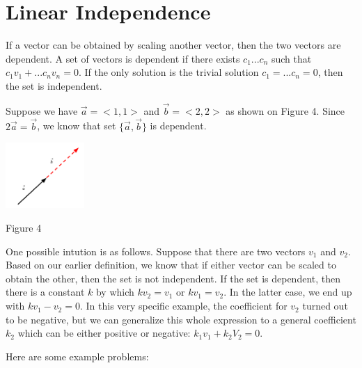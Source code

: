 \documentclass{article}
\begin{document}
\section{Linear Independence}
\par\noindent If a vector can be obtained by scaling another vector, then the two vectors are dependent. A set of vectors is dependent if there exists \( c_1 ... c_n\) such that \(c_1v_1 + ... c_nv_n = 0\). If the only solution is the trivial solution \(c_1 = ... c_n = 0\), then the set is independent. 
\newline
\begin{minipage}[c]{.5\linewidth}
	\par \noindent Suppose we have \( \vec a = <1,1>\) and \( \vec b = <2,2>\) as shown on Figure 4. Since \( 2\vec a = \vec b\), we know that set \( \{ \vec a, \vec b\}\) is dependent.
\end{minipage}%
\begin{minipage}[c]{.5\linewidth}
	\begin{center}
		\includegraphics[width=3cm]{linear-combo.png}
	\end{center}
	\begin{center}
		Figure 4
	\end{center}
\end{minipage}
\newline
\par\noindent One possible intution is as follows. Suppose that there are two vectors \(v_1\) and \(v_2\). Based on our earlier definition, we know that if either vector can be scaled to obtain the other, then the set is not independent. If the set is dependent, then there is a constant \(k\) by which \(kv_2 = v_1\) or \(kv_1 = v_2\). In the latter case, we end up with \(kv_1 - v_2 = 0\). In this very specific example, the coefficient for \(v_2\) turned out to be negative, but we can generalize this whole expression to a general coefficient \(k_2\) which can be either positive or negative: \(k_1v_1 + k_2V_2 = 0\).
\newline
\par \noindent Here are some example problems:
\newline
\newline
\end{document}
